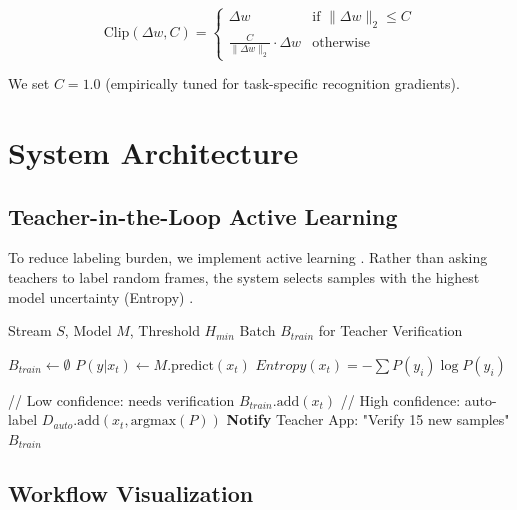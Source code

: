 \documentclass[conference]{IEEEtran}
\begin{document}
\begin{equation}
\text{Clip}(\Delta w, C) = \begin{cases}
\Delta w & \text{if } \|\Delta w\|_2 \leq C \\
\frac{C}{\|\Delta w\|_2} \cdot \Delta w & \text{otherwise}
\end{cases}
\end{equation}

We set $C=1.0$ (empirically tuned for task-specific recognition gradients).

\section{System Architecture}

\subsection{Teacher-in-the-Loop Active Learning}

To reduce labeling burden, we implement active learning \cite{b19}. Rather than asking teachers to label random frames, the system selects samples with the highest model uncertainty (Entropy) \cite{b20}.

\begin{algorithm}[h]
\caption{Active Learning Selection (Edge Node)}
\begin{algorithmic}[1]
\REQUIRE Stream $S$, Model $M$, Threshold $H_{min}$
\ENSURE Batch $B_{train}$ for Teacher Verification

\STATE $B_{train} \leftarrow \emptyset$
    \STATE $P(y|x_t) \leftarrow M.\text{predict}(x_t)$
    \STATE $Entropy(x_t) = -\sum P(y_i)\log P(y_i)$
      
        \STATE // Low confidence: needs verification
        \STATE $B_{train}.\text{add}(x_t)$
    \ELSE
        \STATE // High confidence: auto-label
        \STATE $D_{auto}.\text{add}(x_t, \text{argmax}(P))$
    \ENDIF
\ENDFOR
\STATE \textbf{Notify} Teacher App: "Verify 15 new samples"
\RETURN $B_{train}$
\end{algorithmic}
\label{alg:active_learning}
\end{algorithm}

\subsection{Workflow Visualization}
\end{document}
